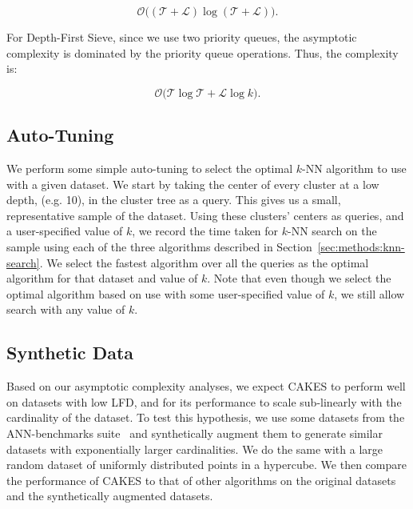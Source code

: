 \begin{equation}
    \mathcal{O} \Big( ( \mathcal{T} + \mathcal{L} ) \log ( \mathcal{T} + \mathcal{L} ) \Big).
    \label{eq:methods:breadth-first-sieve-complexity}
\end{equation}

For Depth-First Sieve, since we use two priority queues, the asymptotic complexity is dominated by the priority queue operations.
Thus, the complexity is:

\begin{equation}
    \mathcal{O} \Big( \mathcal{T} \log \mathcal{T} + \mathcal{L} \log k \Big).
    \label{eq:methods:depth-first-sieve-complexity}
\end{equation}


\subsection{Auto-Tuning}
\label{sec:methods:auto-tuning}

We perform some simple auto-tuning to select the optimal $k$-NN algorithm to use with a given dataset.
We start by taking the center of every cluster at a low depth, (e.g. 10), in the cluster tree as a query.
This gives us a small, representative sample of the dataset.
Using these clusters' centers as queries, and a user-specified value of $k$, we record the time taken for $k$-NN search on the sample using each of the three algorithms described in Section~\ref{sec:methods:knn-search}.
We select the fastest algorithm over all the queries as the optimal algorithm for that dataset and value of $k$.
Note that even though we select the optimal algorithm based on use with some user-specified value of $k$, we still allow search with any value of $k$.


\subsection{Synthetic Data}
\label{sec:methods:synthetic-data}

Based on our asymptotic complexity analyses, we expect CAKES to perform well on datasets with low LFD, and for its performance to scale sub-linearly with the cardinality of the dataset.
To test this hypothesis, we use some datasets from the ANN-benchmarks suite~\cite{aumuller2020ann} and synthetically augment them to generate similar datasets with exponentially larger cardinalities.
We do the same with a large random dataset of uniformly distributed points in a hypercube.
We then compare the performance of CAKES to that of other algorithms on the original datasets and the synthetically augmented datasets.


